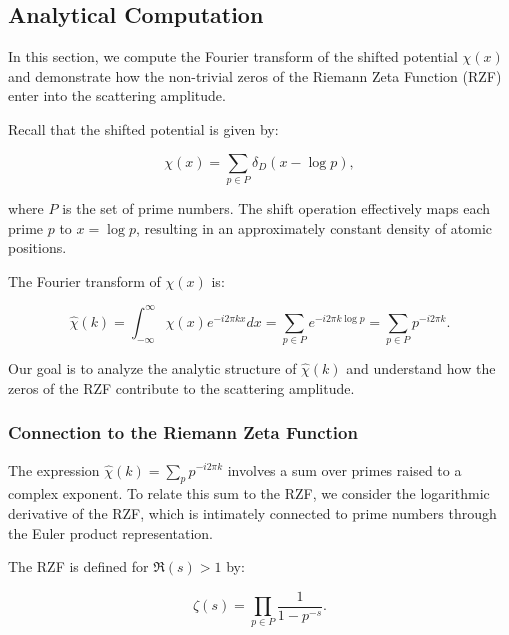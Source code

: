 \documentclass[11pt, oneside]{article}
\begin{document}
 

\subsection{Analytical Computation}

In this section, we compute the Fourier transform of the shifted potential $\chi(x)$ and demonstrate how the non-trivial zeros of the Riemann Zeta Function (RZF) enter into the scattering amplitude.

Recall that the shifted potential is given by:

\begin{equation} \chi(x) = \sum_{p \in P} \delta_D\left(x - \log p\right), \end{equation}

where $P$ is the set of prime numbers. The shift operation effectively maps each prime $p$ to $x = \log p$, resulting in an approximately constant density of atomic positions.

The Fourier transform of $\chi(x)$ is:

\begin{equation} \hat{\chi}(k) = \int_{-\infty}^{\infty} \chi(x) e^{-i 2\pi k x} dx = \sum_{p \in P} e^{-i 2\pi k \log p} = \sum_{p \in P} p^{-i 2\pi k}. \end{equation}

Our goal is to analyze the analytic structure of $\hat{\chi}(k)$ and understand how the zeros of the RZF contribute to the scattering amplitude.

\subsubsection{Connection to the Riemann Zeta Function}

The expression $\hat{\chi}(k) = \sum_{p} p^{-i 2\pi k}$ involves a sum over primes raised to a complex exponent. To relate this sum to the RZF, we consider the logarithmic derivative of the RZF, which is intimately connected to prime numbers through the Euler product representation.

The RZF is defined for $\Re(s) > 1$ by:

\begin{equation} \zeta(s) = \prod_{p \in P} \frac{1}{1 - p^{-s}}. \end{equation}
\end{document}
